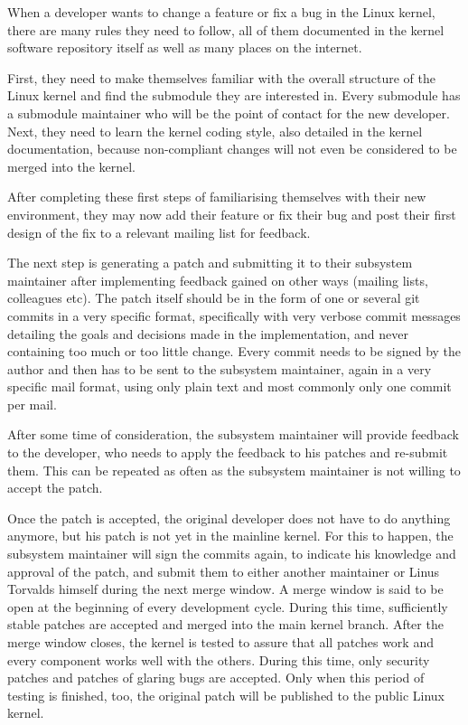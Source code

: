 \documentclass{sig-alternate-05-2015}
\begin{document}
When a developer wants to change a feature or fix a bug in the Linux kernel, there are many rules they need to follow, all of them documented in the kernel software repository itself as well as many places on the internet.

First, they need to make themselves familiar with the overall structure of the Linux kernel and find the submodule they are interested in.
Every submodule has a submodule maintainer who will be the point of contact for the new developer.
Next, they need to learn the kernel coding style, also detailed in the kernel documentation, because non-compliant changes will not even be considered to be merged into the kernel.

After completing these first steps of familiarising themselves with their new environment, they may now add their feature or fix their bug and post their first design of the fix to a relevant mailing list for feedback.

The next step is generating a patch and submitting it to their subsystem maintainer after implementing feedback gained on other ways (mailing lists, colleagues etc).
The patch itself should be in the form of one or several git commits in a very specific format, specifically with very verbose commit messages detailing the goals and decisions made in the implementation, and never containing too much or too little change.
Every commit needs to be signed by the author and then has to be sent to the subsystem maintainer, again in a very specific mail format, using only plain text and most commonly only one commit per mail.

After some time of consideration, the subsystem maintainer will provide feedback to the developer, who needs to apply the feedback to his patches and re-submit them.
This can be repeated as often as the subsystem maintainer is not willing to accept the patch.

Once the patch is accepted, the original developer does not have to do anything anymore, but his patch is not yet in the mainline kernel.
For this to happen, the subsystem maintainer will sign the commits again, to indicate his knowledge and approval of the patch, and submit them to either another maintainer or Linus Torvalds himself during the next merge window.
A merge window is said to be open at the beginning of every development cycle.
During this time, sufficiently stable patches are accepted and merged into the main kernel branch.
After the merge window closes, the kernel is tested to assure that all patches work and every component works well with the others.
During this time, only security patches and patches of glaring bugs are accepted.
Only when this period of testing is finished, too, the original patch will be published to the public Linux kernel.
\end{document}
